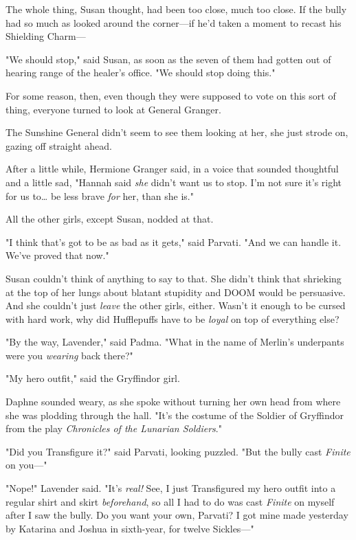 The whole thing, Susan thought, had been too close, much too close. If the
bully had so much as looked around the corner---if he'd taken a moment to
recast his Shielding Charm---

"We should stop," said Susan, as soon as the seven of them had gotten out of
hearing range of the healer's office. "We should stop doing this."

For some reason, then, even though they were supposed to vote on this sort of
thing, everyone turned to look at General Granger.

The Sunshine General didn't seem to see them looking at her, she just strode
on, gazing off straight ahead.

After a little while, Hermione Granger said, in a voice that sounded thoughtful
and a little sad, "Hannah said \emph{she} didn't want us to stop. I'm not sure
it's right for us to{\ldots} be less brave \emph{for} her, than she is."

All the other girls, except Susan, nodded at that.

"I think that's got to be as bad as it gets," said Parvati. "And we can handle
it. We've proved that now."

Susan couldn't think of anything to say to that. She didn't think that
shrieking at the top of her lungs about blatant stupidity and DOOM would be
persuasive. And she couldn't just \emph{leave} the other girls, either. Wasn't
it enough to be cursed with hard work, why did Hufflepuffs have to be
\emph{loyal} on top of everything else?

"By the way, Lavender," said Padma. "What in the name of Merlin's underpants
were you \emph{wearing} back there?"

"My hero outfit," said the Gryffindor girl.

Daphne sounded weary, as she spoke without turning her own head from where she
was plodding through the hall. "It's the costume of the Soldier of Gryffindor
from the play \emph{Chronicles of the Lunarian Soldiers}."

"Did you Transfigure it?" said Parvati, looking puzzled. "But the bully cast
\emph{Finite} on you---"

"Nope!" Lavender said. "It's \emph{real!} See, I just Transfigured my hero
outfit into a regular shirt and skirt \emph{beforehand}, so all I had to do was
cast \emph{Finite} on myself after I saw the bully. Do you want your own,
Parvati? I got mine made yesterday by Katarina and Joshua in sixth-year, for
twelve Sickles---"

